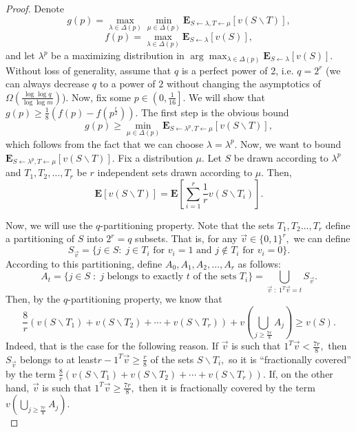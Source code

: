 \documentclass[11pt]{article}%
\numberwithin{theorem}{subsection}
\newcommand{\expect}{\mathbf{E}}
\begin{document}
\begin{proof} Denote 
$$
g(p) = \max_{\lambda\in \Delta(p)}
\min_{\mu \in \Delta(p)}\expect_{S\leftarrow \lambda, T\leftarrow \mu}[v(S\backslash T)],
$$
$$
f(p) = 
\max_{\lambda\in \Delta(p)}
\expect_{S\leftarrow \lambda}[v(S)],
$$
and let $\lambda^p$ be a maximizing distribution in 
$\arg \max_{\lambda\in \Delta(p)}
\expect_{S\leftarrow \lambda}[v(S)].$\\

\noindent
Without loss of generality, assume that $q$ is a perfect power of 2, i.e. $q = 2^r$ (we can always decrease $q$ to a power of $2$ without changing the asymptotics of $\Omega(\frac{\log \log q}{\log \log m})$). 
Now, fix some $p\in \left(0,\frac{1}{16}\right].$ We will show that $
g(p)\ge \frac{1}{8}\left(f(p) -f(p^{\frac{r}{2}}) \right).$
The first step is the obvious bound 
$$
g(p)\ge \min_{\mu \in \Delta(p)}\expect_{S\leftarrow \lambda^p, T\leftarrow \mu}[v(S\backslash T)],
$$
which follows from the fact that we can choose $\lambda = \lambda^p.$
Now, we want to bound $\expect_{S\leftarrow \lambda^p, T\leftarrow \mu}[v(S\backslash T)].$ Fix a distribution $\mu.$ Let $S$ be drawn according to $\lambda^p$ and $T_1, T_2, \ldots, T_r$ be $r$ independent sets drawn according to $\mu.$ Then,
$$
\expect[v(S\backslash T)] = 
\expect\left[
\sum_{i = 1}^r\frac{1}{r}v(S\backslash T_i)
\right].
$$

\noindent
Now, we will use the $q$-partitioning property. Note that the sets $T_1, T_2 \ldots, T_r$ define a partitioning of $S$ into $2^r = q$  subsets. That is, for any $\vec{v}\in \{0,1\}^r,$ we can define 
\begin{equation}
\tag{Partitioning with $r$ sets}
\label{eq:partwithrsets}
S_{\vec{v}} = \{j\in S: \; j \in T_i \text{ for }v_i = 1 \text{ and }j \not \in T_i \text{ for }v_i =0\}. 
\end{equation}
According to this partitioning, define $A_0, A_1, A_2, \ldots, A_r$ as follows:
$$
A_t = \{j \in S\; : \; j \text{ belongs to exactly }t \text{ of the sets }T_i\}
 = \bigcup_{\vec{v}\; :\; 1^T\vec{v} = t}S_{\vec{v}}.
$$
Then, by the $q$-partitioning property, we know that 
$$
\frac{8}{r}\left(
v(S\backslash T_1) + v(S\backslash T_2) + \cdots + 
v(S\backslash T_r)
\right) + 
v(\bigcup_{j \ge \frac{7r}{8}}A_j)\ge v(S).
$$
Indeed, that is the case for the following reason. If $\vec{v}$ is such that $1^T\vec{v}< \frac{7r}{8},$ then $S_{\vec{v}}$ belongs to at least\linebreak $r - 1^T\vec{v}\ge \frac{r}{8}$ of the sets $S\backslash T_i,$ so it is ``fractionally covered'' by the term\linebreak
$\frac{8}{r}\left(
v(S\backslash T_1) + v(S\backslash T_2) + \cdots + 
v(S\backslash T_r)\right).$ 
If, on the other hand, $\vec{v}$ is such that $1^T\vec{v}\ge \frac{7r}{8},$ then it is fractionally covered by the term $v(\bigcup_{j \ge \frac{7r}{8}}A_j).$\\


\end{proof}
\end{document}
